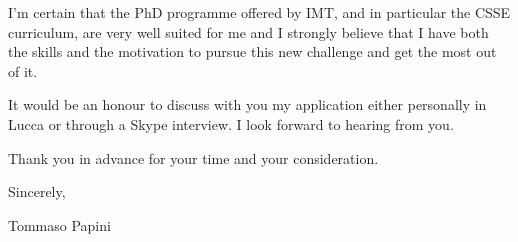 \documentclass{article}
\begin{document}
    I'm certain that the PhD programme offered by IMT, and in particular the CSSE curriculum, are very well suited for me and I strongly believe that I have both the skills and the motivation to pursue this new challenge and get the most out of it. \par \bigskip
    
    It would be an honour to discuss with you my application either personally in Lucca or through a Skype interview. I look forward to hearing from you. \par \bigskip
    
    Thank you in advance for your time and your consideration. \par \bigskip
    
    Sincerely, \par \medskip
    
    \qquad \qquad Tommaso Papini
\end{document}
